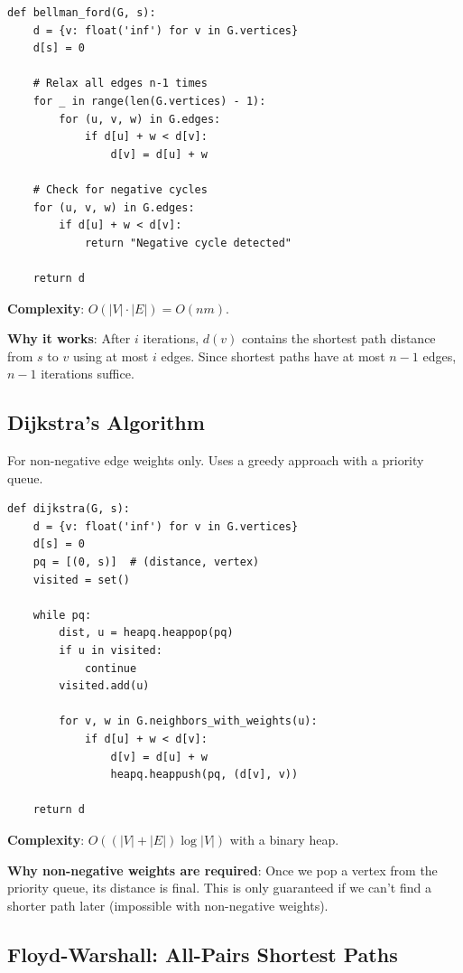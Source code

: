 \documentclass[11pt]{article}
\begin{document}
{{{\begin{lstlisting}
def bellman_ford(G, s):
    d = {v: float('inf') for v in G.vertices}
    d[s] = 0
    
    # Relax all edges n-1 times
    for _ in range(len(G.vertices) - 1):
        for (u, v, w) in G.edges:
            if d[u] + w < d[v]:
                d[v] = d[u] + w
    
    # Check for negative cycles
    for (u, v, w) in G.edges:
        if d[u] + w < d[v]:
            return "Negative cycle detected"
    
    return d
\end{lstlisting}

\textbf{Complexity}: $O(|V| \cdot |E|) = O(nm)$.

\textbf{Why it works}: After $i$ iterations, $d(v)$ contains the shortest path distance from $s$ to $v$ using at most $i$ edges. Since shortest paths have at most $n-1$ edges, $n-1$ iterations suffice.

\subsection*{Dijkstra's Algorithm}

For non-negative edge weights only. Uses a greedy approach with a priority queue.

\begin{lstlisting}
def dijkstra(G, s):
    d = {v: float('inf') for v in G.vertices}
    d[s] = 0
    pq = [(0, s)]  # (distance, vertex)
    visited = set()
    
    while pq:
        dist, u = heapq.heappop(pq)
        if u in visited:
            continue
        visited.add(u)
        
        for v, w in G.neighbors_with_weights(u):
            if d[u] + w < d[v]:
                d[v] = d[u] + w
                heapq.heappush(pq, (d[v], v))
    
    return d
\end{lstlisting}

\textbf{Complexity}: $O((|V| + |E|) \log |V|)$ with a binary heap.

\textbf{Why non-negative weights are required}: Once we pop a vertex from the priority queue, its distance is final. This is only guaranteed if we can't find a shorter path later (impossible with non-negative weights).

\subsection*{Floyd-Warshall: All-Pairs Shortest Paths}

}}}
\end{document}
